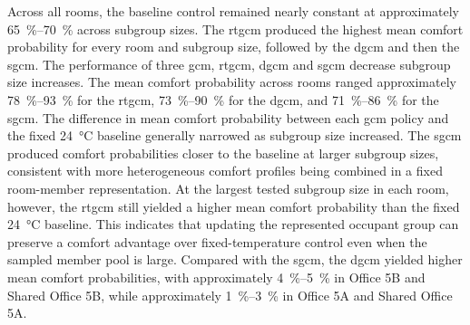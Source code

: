 Across all rooms, the baseline control remained nearly constant at approximately \qtyrange{65}{70}{\percent} across subgroup sizes.
The \ac{rtgcm} produced the highest mean comfort probability for every room and subgroup size, followed by the \ac{dgcm} and then the \ac{sgcm}.
The performance of three \ac{gcm}, \ac{rtgcm}, \ac{dgcm} and \ac{sgcm} decrease subgroup size increases.
The mean comfort probability across rooms ranged approximately \qtyrange{78}{93}{\percent} for the \ac{rtgcm}, \qtyrange{73}{90}{\percent} for the \ac{dgcm}, and \qtyrange{71}{86}{\percent} for the \ac{sgcm}.
The difference in mean comfort probability between each \ac{gcm} policy and the fixed \qty{24}{\celsius} baseline generally narrowed as subgroup size increased.
The \ac{sgcm} produced comfort probabilities closer to the baseline at larger subgroup sizes, consistent with more heterogeneous comfort profiles being combined in a fixed room-member representation.
At the largest tested subgroup size in each room, however, the \ac{rtgcm} still yielded a higher mean comfort probability than the fixed \qty{24}{\celsius} baseline.
This indicates that updating the represented occupant group can preserve a comfort advantage over fixed-temperature control even when the sampled member pool is large.
Compared with the \ac{sgcm}, the \ac{dgcm} yielded higher mean comfort probabilities, with approximately \qtyrange{4}{5}{\percent} in Office 5B and Shared Office 5B, while approximately \qtyrange{1}{3}{\percent} in Office 5A and Shared Office 5A.

